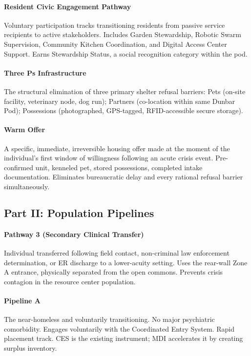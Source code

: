 {\paragraph{Resident Civic Engagement Pathway} Voluntary participation tracks transitioning residents from passive service recipients to active stakeholders. Includes Garden Stewardship, Robotic Swarm Supervision, Community Kitchen Coordination, and Digital Access Center Support. Earns Stewardship Status, a social recognition category within the pod.

\paragraph{Three Ps Infrastructure} The structural elimination of three primary shelter refusal barriers: Pets (on-site facility, veterinary node, dog run); Partners (co-location within same Dunbar Pod); Possessions (photographed, GPS-tagged, RFID-accessible secure storage).

\paragraph{Warm Offer} A specific, immediate, irreversible housing offer made at the moment of the individual's first window of willingness following an acute crisis event. Pre-confirmed unit, kenneled pet, stored possessions, completed intake documentation. Eliminates bureaucratic delay and every rational refusal barrier simultaneously.

\subsection*{Part II: Population Pipelines}

\paragraph{Pathway 3 (Secondary Clinical Transfer)} Individual transferred following field contact, non-criminal law enforcement determination, or ER discharge to a lower-acuity setting. Uses the rear-wall Zone A entrance, physically separated from the open commons. Prevents crisis contagion in the resource center population.

\paragraph{Pipeline A} The near-homeless and voluntarily transitioning. No major psychiatric comorbidity. Engages voluntarily with the Coordinated Entry System. Rapid placement track. CES is the existing instrument; MDI accelerates it by creating surplus inventory.

}
